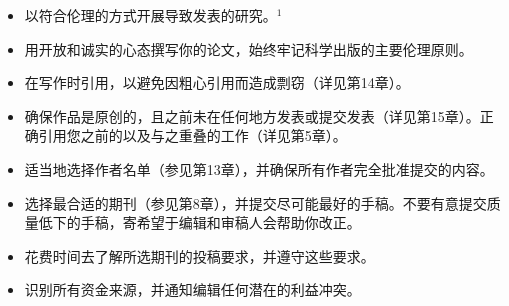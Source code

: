 \begin{itemize}
\item 以符合伦理的方式开展导致发表的研究。${ }^{1}$
\item 用开放和诚实的心态撰写你的论文，始终牢记科学出版的主要伦理原则。
\item 在写作时引用，以避免因粗心引用而造成剽窃（详见第14章）。
\item 确保作品是原创的，且之前未在任何地方发表或提交发表（详见第15章）。正确引用您之前的以及与之重叠的工作（详见第5章）。
\item 适当地选择作者名单（参见第13章），并确保所有作者完全批准提交的内容。
\item 选择最合适的期刊（参见第8章），并提交尽可能最好的手稿。不要有意提交质量低下的手稿，寄希望于编辑和审稿人会帮助你改正。
\item 花费时间去了解所选期刊的投稿要求，并遵守这些要求。
\item 识别所有资金来源，并通知编辑任何潜在的利益冲突。
\end{itemize}

